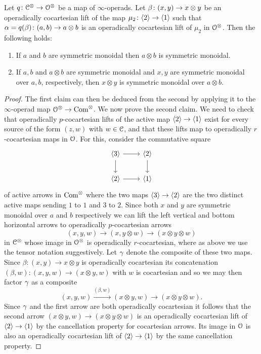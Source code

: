 \begin{lemma}
\label{lemma:sm-closed-under-tensor}%
Let $q\colon \mathcal C^{\otimes} \to \mathcal{O}^{\otimes}$ be a map of $\infty$-operads.
Let $\beta\colon (x,y) \to x\otimes y$ be an operadically cocartesian lift of the map $\mu_2\colon \langle2\rangle \to \langle1\rangle$ such that $\alpha=q(\beta)\colon (a,b) \to a\otimes b$ is an operadically cocartesian lift of $\mu_2$ in $\mathcal{O}^{\otimes}$. Then the following holds:
\begin{enumerate}
\item
If $a$ and $b$ are symmetric monoidal then $a\otimes b$ is symmetric monoidal.
\item
If $a,b$ and $a\otimes b$ are symmetric monoidal and $x,y$ are symmetric monoidal over $a,b$, respectively, then $x\otimes y$ is symmetric monoidal over $a\otimes b$.
\end{enumerate}
\end{lemma}
\begin{proof}
The first claim can then be deduced from the second by applying it to the $\infty$-operad map $\mathcal{O}^{\otimes} \to \mathrm{Com}^{\otimes}$.
We now prove the second claim. We need to check that operadically $p$-cocartesian lifts of the active map $\langle2\rangle \to \langle1\rangle$ exist for every source of the form $(z,w)$ with $w \in \mathcal C$, and that these lifts map to operadically $r$-cocartesian maps in $\mathcal{O}$. For this, consider the commutative square
\[
\begin{tikzcd}
\<3\>\ar[r]\ar[d] & \<2\> \ar[d] \\
\<2\> \ar[r] & \<1\>
\end{tikzcd}
\]
of active arrows in $\mathrm{Com}^{\otimes}$ where the two maps $\langle3\rangle \to \langle2\rangle$ are the two distinct active maps sending $1$ to $1$ and $3$ to $2$. Since both $x$ and $y$ are symmetric monoidal over $a$ and $b$ respectively
we can lift the left vertical and bottom horizontal arrows to operadically $p$-cocartesian arrows 
\[
(x,y,w) \to (x,y \otimes w) \to (x \otimes y \otimes w)
\]
in $\mathcal C^{\otimes}$ whose image in $\mathcal{O}^{\otimes}$ is operadically $r$-cocartesian, where as above we use the tensor notation suggestively. Let $\gamma$ denote the composite of these two maps.
Since $\beta\colon (x,y) \to x\otimes y$ is operadically cocartesian its concatenation $(\beta,w)\colon (x,y,w) \to (x\otimes y,w)$ with $w$ is cocartesian and so we may then factor $\gamma$ as a composite
\[
(x,y,w) \xrightarrow{(\beta,w)} (x\otimes y,w) \to (x \otimes y \otimes w) .
\]
Since $\gamma$ and the first arrow are both operadically cocartesian it follows that the second arrow $(x\otimes y,w) \to (x \otimes y \otimes w)$ is an operadically cocartesian lift of $\langle2\rangle \to \langle1\rangle$ by the cancellation property for cocartesian arrows. Its image in $\mathcal{O}$ is also an operadically cocartesian lift of $\langle2\rangle \to \langle1\rangle$ by the same cancellation property. %


\end{proof}


